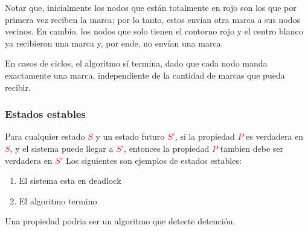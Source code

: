Notar que, inicialmente los nodos que están totalmente en rojo son los que por primera vez reciben la marca; por lo tanto, estos envían otra marca a sus nodos vecinos. En cambio, los nodos que solo tienen el contorno rojo y el centro blanco ya recibieron una marca y, por ende, no envían una marca.

En casos de ciclos, el algoritmo sí termina, dado que cada nodo manda exactamente una marca, independiente de la cantidad de marcas que pueda recibir.

 \subsubsection{Estados estables}
 Para cualquier estado \textcolor{red}{\textbf{$S$}} y un estado futuro \textcolor{red}{\textbf{$S'$}}, si la propiedad \textcolor{red}{\textbf{$P$}} es verdadera en \textcolor{red}{\textbf{$S$}}, y el sistema puede llegar a \textcolor{red}{\textbf{$S'$}}, entonces la propiedad \textcolor{red}{\textbf{$P$}} tambien debe ser verdadera en \textcolor{red}{\textbf{$S'$}}
 Los siguientes son ejemplos de estados estables:
 \begin{enumerate}
   \item El sistema esta en deadlock
   \item El algoritmo termino
 \end{enumerate}
 Una propiedad podria ser un algoritmo que detecte detención.
